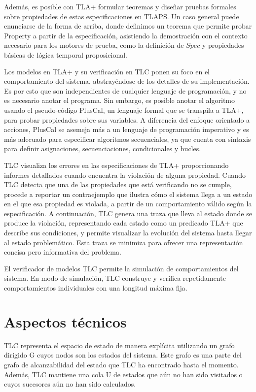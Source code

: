 \documentclass[runningheads]{llncs}
\begin{document}
Además, es posible con TLA+ formular teoremas y diseñar pruebas formales sobre propiedades de estas especificaciones en TLAPS. Un caso general puede enunciarse de la forma de arriba, donde definimos un teorema que permite probar Property a partir de la especificación, asistiendo la demostración con el contexto necesario para los motores de prueba, como la definición de $Spec$ y propiedades básicas de lógica temporal proposicional.

Los modelos en TLA+ y su verificación en TLC ponen su foco en el comportamiento del sistema, abstrayéndose de los detalles de su implementación. Es por esto que son independientes de cualquier lenguaje de programación, y no es necesario anotar el programa. Sin embargo, es posible anotar el algoritmo usando el pseudo-código PlusCal, un lenguaje formal que se transpila a TLA+, para probar propiedades sobre sus variables. A diferencia del enfoque orientado a acciones, PlusCal se asemeja más a un lenguaje de programación imperativo y es más adecuado para especificar algoritmos secuenciales, ya que cuenta con sintaxis para definir asignaciones, secuenciaciones, condicionales y bucles.

TLC visualiza los errores en las especificaciones de TLA+ proporcionando informes detallados cuando encuentra la violación de alguna propiedad. Cuando TLC detecta que una de las propiedades que está verificando no se cumple, procede a reportar un contraejemplo que ilustra cómo el sistema llega a un estado en el que esa propiedad es violada, a partir de un comportamiento válido según la especificación. A continuación, TLC genera una traza que lleva al estado donde se produce la violación, representando cada estado como un predicado TLA+ que describe sus condiciones, y permite visualizar la evolución del sistema hasta llegar al estado problemático. Esta traza se minimiza para ofrecer una representación concisa pero informativa del problema. 

El verificador de modelos TLC permite la simulación de comportamientos del sistema. En modo de simulación, TLC construye y verifica repetidamente comportamientos individuales con una longitud máxima fija.

\section{Aspectos técnicos}
TLC representa el espacio de estado de manera explícita utilizando un grafo dirigido G cuyos nodos son los estados del sistema. Este grafo es una parte del grafo de alcanzabilidad del estado que TLC ha encontrado hasta el momento. Además, TLC mantiene una cola U de estados que aún no han sido visitados o cuyos sucesores aún no han sido calculados.
\end{document}
